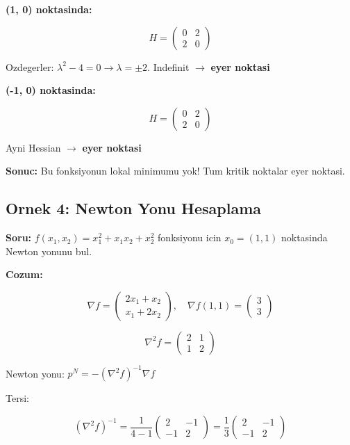 \documentclass[12pt,a4paper]{article}
\theoremstyle{definition}
\theoremstyle{remark}
\begin{document}
\textbf{(1, 0) noktasinda:}

\[
H = \begin{pmatrix} 0 & 2 \\ 2 & 0 \end{pmatrix}
\]

Ozdegerler: $\lambda^2 - 4 = 0 \rightarrow \lambda = \pm 2$. Indefinit $\rightarrow$ \textbf{eyer noktasi}

\textbf{(-1, 0) noktasinda:}

\[
H = \begin{pmatrix} 0 & 2 \\ 2 & 0 \end{pmatrix}
\]

Ayni Hessian $\rightarrow$ \textbf{eyer noktasi}

\textbf{Sonuc:} Bu fonksiyonun lokal minimumu yok! Tum kritik noktalar eyer noktasi.

\subsection{Ornek 4: Newton Yonu Hesaplama}

\textbf{Soru:} $f(x_1, x_2) = x_1^2 + x_1 x_2 + x_2^2$ fonksiyonu icin $x_0 = (1, 1)$ noktasinda Newton yonunu bul.

\bigskip
\textbf{Cozum:}

\[
\nabla f = \begin{pmatrix} 2x_1 + x_2 \\ x_1 + 2x_2 \end{pmatrix}, \quad \nabla f(1,1) = \begin{pmatrix} 3 \\ 3 \end{pmatrix}
\]

\[
\nabla^2 f = \begin{pmatrix} 2 & 1 \\ 1 & 2 \end{pmatrix}
\]

Newton yonu: $p^N = -(\nabla^2 f)^{-1} \nabla f$

Tersi:

\[
(\nabla^2 f)^{-1} = \frac{1}{4-1} \begin{pmatrix} 2 & -1 \\ -1 & 2 \end{pmatrix} = \frac{1}{3} \begin{pmatrix} 2 & -1 \\ -1 & 2 \end{pmatrix}
\]
\end{document}
